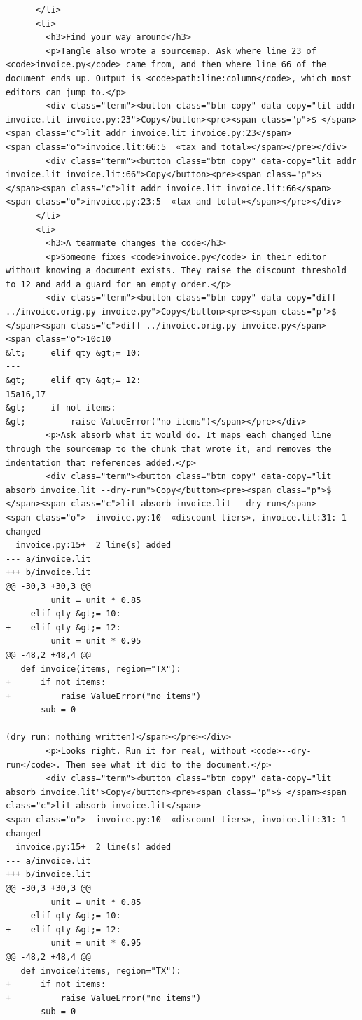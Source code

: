\documentclass[10pt,a4paper]{article}
\newcounter{chunk}
\begin{document}
\begin{Verbatim}
      </li>
      <li>
        <h3>Find your way around</h3>
        <p>Tangle also wrote a sourcemap. Ask where line 23 of <code>invoice.py</code> came from, and then where line 66 of the document ends up. Output is <code>path:line:column</code>, which most editors can jump to.</p>
        <div class="term"><button class="btn copy" data-copy="lit addr invoice.lit invoice.py:23">Copy</button><pre><span class="p">$ </span><span class="c">lit addr invoice.lit invoice.py:23</span>
<span class="o">invoice.lit:66:5  «tax and total»</span></pre></div>
        <div class="term"><button class="btn copy" data-copy="lit addr invoice.lit invoice.lit:66">Copy</button><pre><span class="p">$ </span><span class="c">lit addr invoice.lit invoice.lit:66</span>
<span class="o">invoice.py:23:5  «tax and total»</span></pre></div>
      </li>
      <li>
        <h3>A teammate changes the code</h3>
        <p>Someone fixes <code>invoice.py</code> in their editor without knowing a document exists. They raise the discount threshold to 12 and add a guard for an empty order.</p>
        <div class="term"><button class="btn copy" data-copy="diff ../invoice.orig.py invoice.py">Copy</button><pre><span class="p">$ </span><span class="c">diff ../invoice.orig.py invoice.py</span>
<span class="o">10c10
&lt;     elif qty &gt;= 10:
---
&gt;     elif qty &gt;= 12:
15a16,17
&gt;     if not items:
&gt;         raise ValueError("no items")</span></pre></div>
        <p>Ask absorb what it would do. It maps each changed line through the sourcemap to the chunk that wrote it, and removes the indentation that references added.</p>
        <div class="term"><button class="btn copy" data-copy="lit absorb invoice.lit --dry-run">Copy</button><pre><span class="p">$ </span><span class="c">lit absorb invoice.lit --dry-run</span>
<span class="o">  invoice.py:10  «discount tiers», invoice.lit:31: 1 changed
  invoice.py:15+  2 line(s) added
--- a/invoice.lit
+++ b/invoice.lit
@@ -30,3 +30,3 @@
         unit = unit * 0.85
-    elif qty &gt;= 10:
+    elif qty &gt;= 12:
         unit = unit * 0.95
@@ -48,2 +48,4 @@
   def invoice(items, region="TX"):
+      if not items:
+          raise ValueError("no items")
       sub = 0

(dry run: nothing written)</span></pre></div>
        <p>Looks right. Run it for real, without <code>--dry-run</code>. Then see what it did to the document.</p>
        <div class="term"><button class="btn copy" data-copy="lit absorb invoice.lit">Copy</button><pre><span class="p">$ </span><span class="c">lit absorb invoice.lit</span>
<span class="o">  invoice.py:10  «discount tiers», invoice.lit:31: 1 changed
  invoice.py:15+  2 line(s) added
--- a/invoice.lit
+++ b/invoice.lit
@@ -30,3 +30,3 @@
         unit = unit * 0.85
-    elif qty &gt;= 10:
+    elif qty &gt;= 12:
         unit = unit * 0.95
@@ -48,2 +48,4 @@
   def invoice(items, region="TX"):
+      if not items:
+          raise ValueError("no items")
       sub = 0


\end{Verbatim}
\end{document}
